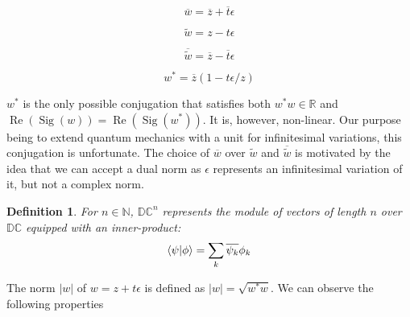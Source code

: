 \documentclass{article}
\newtheorem{definition}[theorem]{Definition}
\newcommand{\N}{\mathbb{N}}
\newcommand{\R}{\mathbb{R}}
\newcommand{\DC}{\mathbb{DC}}
\newcommand{\e}{\epsilon}
\newcommand{\til}{\widetilde}
\renewcommand{\bar}{\overline}
\renewcommand{\Re}{\operatorname{Re}}
\newcommand{\Sig}{\operatorname{Sig}}
\begin{document}
\begin{multicols}{4}
\noindent \begin{equation}
\bar{w} = \bar{z} + \bar{t}\e
\end{equation}

\columnbreak

\noindent \begin{equation}
\til{w} = z - t\e
\end{equation}

\columnbreak

\noindent \begin{equation}
\bar{\til{w}} = \bar{z} - \bar{t}\e
\end{equation}

\columnbreak

\noindent \begin{equation}
w^* = \bar{z}(1-t\e/z)
\end{equation}
\end{multicols}

$w^*$ is the only possible conjugation that satisfies both $w^*w \in \R$ and $\Re(\Sig(w)) = \Re(\Sig(w^*))$. It is, however, non-linear. Our purpose being to extend quantum mechanics with a unit for infinitesimal variations, this conjugation is unfortunate. The choice of $\bar{w}$ over $\til{w}$ and $\bar{\til{w}}$ is motivated by the idea that we can accept a dual norm as $\e$ represents an infinitesimal variation of it, but not a complex norm.

\begin{definition}
For $n \in \N$, $\DC^n$ represents the module of vectors of length $n$ over $\DC$ equipped with an inner-product:
\begin{equation}
 \braket{\psi|\phi} = \sum_k \bar{\psi_k}\phi_k
\end{equation}

\end{definition}

The norm $|w|$ of $w = z + t\e$ is defined as $|w| = \sqrt{w^* w}$. We can observe the following properties
\end{document}
